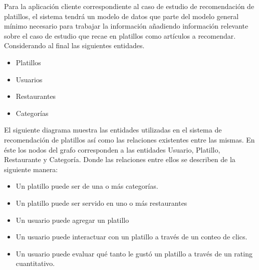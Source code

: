       Para la aplicación cliente correspondiente al caso de estudio de recomendación de platillos, el sistema tendrá un modelo de datos que parte del modelo general mínimo necesario para trabajar la información añadiendo información relevante sobre el caso de estudio que recae en platillos como artículos a recomendar. Considerando al final las siguientes entidades.
      \begin{itemize}
        \item Platillos
        \item Usuarios
        \item Restaurantes
        \item Categorías
      \end{itemize}

      El siguiente diagrama muestra las entidades utilizadas en el sistema de recomendación de platillos así como las relaciones existentes entre las mismas. En éste los nodos del grafo corresponden a las entidades Usuario, Platillo, Restaurante y Categoría. Donde las relaciones entre ellos se describen de la siguiente manera: 
      \begin{itemize}
        \item Un platillo puede ser de una o más categorías.
        \item Un platillo puede ser servido en uno o más restaurantes
        \item Un usuario puede agregar un platillo
        \item Un usuario puede interactuar con un platillo a través de un conteo de clics.
        \item Un usuario puede evaluar qué tanto le gustó un platillo a través de un rating cuantitativo.
      \end{itemize} 

